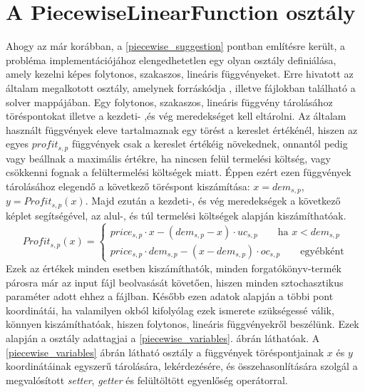 \section{A PiecewiseLinearFunction osztály} \label{piecewise_class}
Ahogy az már korábban, a \ref{piecewise_suggestion} pontban említésre került, a probléma implementációjához elengedhetetlen egy olyan osztály definiálása, amely kezelni képes folytonos, szakaszos, lineáris függvényeket.
Erre hivatott az általam megalkotott  osztály, amelynek forráskódja , illetve  fájlokban található a solver  mappájában.
Egy folytonos, szakaszos, lineáris függvény tárolásához töréspontokat illetve a kezdeti- ,és vég meredekséget kell eltárolni.
Az általam használt függvények eleve tartalmaznak egy törést a kereslet értékénél, hiszen az egyes $profit_{s,p}$ függvények csak a kereslet értékéig növekednek, onnantól pedig vagy beállnak a maximális értékre, ha nincsen felül termelési költség, vagy csökkenni fognak a felültermelési költségek miatt.
Éppen ezért ezen függvények tárolásához elegendő a következő töréspont kiszámítása: $x=dem_{s,p}$, $y=Profit_{s,p}(x)$. 
Majd ezután a kezdeti-, és vég meredekségek a következő képlet segítségével, az alul-, és túl termelési költségek alapján kiszámíthatóak.
\begin{equation*}
Profit_{s,p}(x)= \begin{cases}
            price_{s,p}\cdot x-(dem_{s,p}-x) \cdot uc_{s,p}\qquad \text{ha } x<dem_{s,p} \\
            price_{s,p} \cdot dem_{s,p}-(x-dem_{s,p}) \cdot oc_{s,p}\qquad \text{egyébként}
       \end{cases}
\end{equation*}
Ezek az értékek minden esetben kiszámíthatók, minden forgatókönyv-termék párosra már az input fájl beolvasását követően, hiszen minden sztochasztikus paraméter adott ehhez a fájlban.
Később ezen adatok alapján a többi pont koordinátái, ha valamilyen okból kifolyólag ezek ismerete szükségessé válik, könnyen kiszámíthatóak, hiszen folytonos, lineáris függvényekről beszélünk.
Ezek alapján a  osztály adattagjai a \ref{piecewise_variables}. ábrán láthatóak.
A \ref{piecewise_variables} ábrán látható  osztály a függvények töréspontjainak $x$ és $y$ koordinátáinak egyszerű tárolására, lekérdezésére, és összehasonlítására szolgál a megvalósított \textit{setter}, \textit{getter} és felültöltött egyenlőség operátorral.
